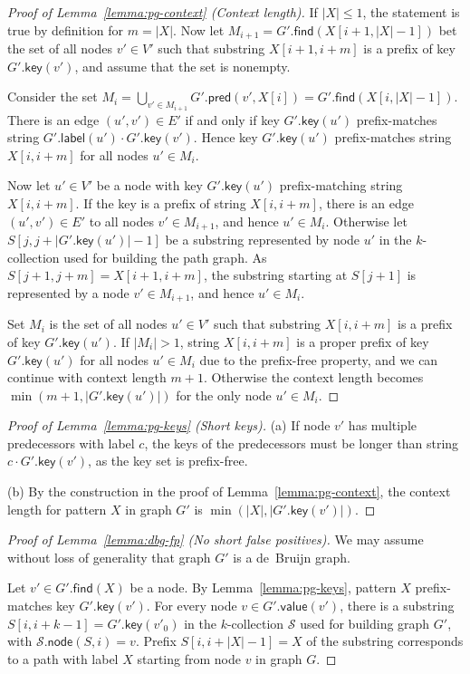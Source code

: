 \documentclass[a4paper,UKenglish]{lipics-v2016}
\newcommand{\abs}[1]{\ensuremath{\lvert #1 \rvert}}
\newcommand{\find}{\ensuremath{\mathsf{find}}}
\newcommand{\glabel}{\ensuremath{\mathsf{label}}}
\newcommand{\gpred}{\ensuremath{\mathsf{pred}}}
\newcommand{\gkey}{\ensuremath{\mathsf{key}}}
\newcommand{\gvalue}{\ensuremath{\mathsf{value}}}
\newcommand{\gnode}{\ensuremath{\mathsf{node}}}
\newcommand{\kcollection}[1]{$#1$\nobreakdash-collection}
\begin{document}
\begin{proof}[Proof of Lemma~\ref{lemma:pg-context} (Context length)]
If $\abs{X} \le 1$, the statement is true by definition for $m = \abs{X}$. Now let $M_{i+1} = G'.\find(X[i+1, \abs{X}-1])$ bet the set of all nodes $v' \in V'$ such that substring $X[i+1, i+m]$ is a prefix of key $G'.\gkey(v')$, and assume that the set is nonempty.

Consider the set $M_{i} = \bigcup_{v' \in M_{i+1}} G'.\gpred(v', X[i]) = G'.\find(X[i, \abs{X}-1])$. There is an edge $(u', v') \in E'$ if and only if key $G'.\gkey(u')$ prefix-matches string $G'.\glabel(u') \cdot G'.\gkey(v')$. Hence key $G'.\gkey(u')$ prefix-matches string $X[i, i+m]$ for all nodes $u' \in M_{i}$.

Now let $u' \in V'$ be a node with key $G'.\gkey(u')$ prefix-matching string $X[i, i+m]$. If the key is a prefix of string $X[i, i+m]$, there is an edge $(u', v') \in E'$ to all nodes $v' \in M_{i+1}$, and hence $u' \in M_{i}$. Otherwise let $S[j, j+\abs{G'.\gkey(u')}-1]$ be a substring represented by node $u'$ in the \kcollection{k} used for building the path graph. As $S[j+1, j+m] = X[i+1, i+m]$, the substring starting at $S[j+1]$ is represented by a node $v' \in M_{i+1}$, and hence $u' \in M_{i}$.

Set $M_{i}$ is the set of all nodes $u' \in V'$ such that substring $X[i, i+m]$ is a prefix of key $G'.\gkey(u')$. If $\abs{M_{i}} > 1$, string $X[i, i+m]$ is a proper prefix of key $G'.\gkey(u')$ for all nodes $u' \in M_{i}$ due to the prefix-free property, and we can continue with context length $m+1$. Otherwise the context length becomes $\min(m+1, \abs{G'.\gkey(u')})$ for the only node $u' \in M_{i}$.
\end{proof}

\begin{proof}[Proof of Lemma~\ref{lemma:pg-keys} (Short keys)]
(a) If node $v'$ has multiple predecessors with label $c$, the keys of the predecessors must be longer than string $c \cdot G'.\gkey(v')$, as the key set is prefix-free.

(b) By the construction in the proof of Lemma~\ref{lemma:pg-context}, the context length for pattern $X$ in graph $G'$ is $\min(\abs{X}, \abs{G'.\gkey(v')})$.
\end{proof}

\begin{proof}[Proof of Lemma~\ref{lemma:dbg-fp} (No short false positives)]
We may assume without loss of generality that graph $G'$ is a de~Bruijn graph.

Let $v' \in G'.\find(X)$ be a node. By Lemma~\ref{lemma:pg-keys}, pattern $X$ prefix-matches key $G'.\gkey(v')$. For every node $v \in G'.\gvalue(v')$, there is a substring $S[i, i+k-1] = G'.\gkey(v'_{0})$ in the \kcollection{k} $\mathcal{S}$ used for building graph $G'$, with $\mathcal{S}.\gnode(S, i) = v$. Prefix $S[i, i+\abs{X}-1] = X$ of the substring corresponds to a path with label $X$ starting from node $v$ in graph $G$.
\end{proof}
\end{document}
